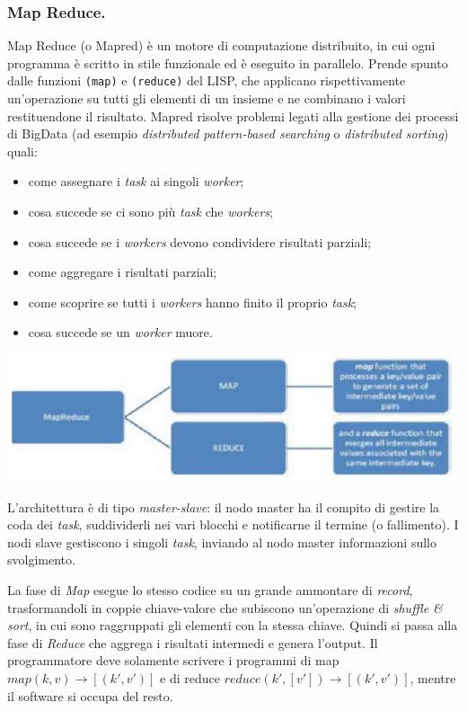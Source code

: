 \documentclass[a4page, 11pt]{article}
\begin{document}
\subsubsection{Map Reduce.}
Map Reduce (o Mapred) è un motore di computazione distribuito, in cui ogni programma è scritto in stile funzionale ed è eseguito in parallelo.
Prende spunto dalle funzioni \verb|(map)| e \verb|(reduce)| del LISP, che applicano rispettivamente un'operazione su tutti gli elementi di un insieme e ne combinano i valori restituendone il risultato.
Mapred risolve problemi legati alla gestione dei processi di BigData (ad esempio \textit{distributed pattern-based searching} o \textit{distributed sorting}) quali:
\begin{itemize}
\item come assegnare i \textit{task} ai singoli \textit{worker};
\item cosa succede se ci sono più \textit{task} che \textit{workers};
\item cosa succede se i \textit{workers} devono condividere risultati parziali;
\item come aggregare i risultati parziali;
\item come scoprire se tutti i \textit{workers} hanno finito il proprio \textit{task};
\item cosa succede se un \textit{worker} muore.
\end{itemize}
\begin{center}
  \includegraphics[scale=1]{IMAGE8.png}
\end{center}

L'architettura è di tipo \textit{master-slave}: il nodo master ha il compito di gestire la coda dei \textit{task}, suddividerli nei vari blocchi e notificarne il termine (o fallimento).
I nodi slave gestiscono i singoli \textit{task}, inviando al nodo master informazioni sullo svolgimento.

La fase di \textit{Map} esegue lo stesso codice su un grande ammontare di \textit{record}, trasformandoli in coppie chiave-valore che subiscono un'operazione di \textit{shuffle \& sort}, in cui sono raggruppati gli elementi con la stessa chiave.
Quindi si passa alla fase di \textit{Reduce} che aggrega i risultati intermedi e genera l'output.
Il programmatore deve solamente scrivere i programmi di map $map (k, v) \rightarrow [(k', v')]$ e di reduce $reduce (k', [v']) \rightarrow [(k', v')]$, mentre il software si occupa del resto.
\end{document}
